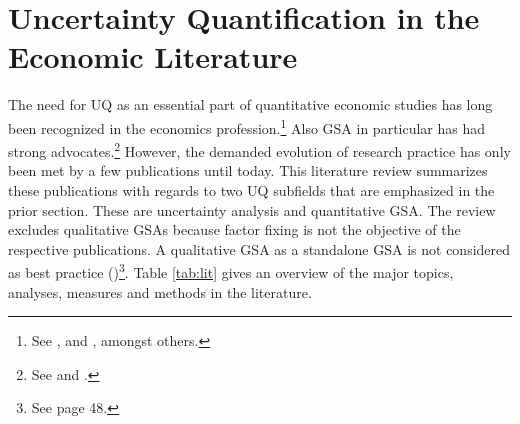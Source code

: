 \section{Uncertainty Quantification in the Economic Literature}
\thispagestyle{plain} %

The need for UQ as an essential part of quantitative economic studies has long been recognized in the economics profession.\footnote{See \cite{Hansen.1996}, \cite{Kydland.1992} and \cite{Canova.1994}, amongst others.} Also GSA in particular has had strong advocates.\footnote{See \cite{Canova.1995} and \cite{Gregory.1995}.} However, the demanded evolution of research practice has only been met by a few publications until today. This literature review summarizes these publications with regards to two UQ subfields that are emphasized in the prior section. These are uncertainty analysis and quantitative GSA. The review excludes qualitative GSAs because factor fixing is not the objective of the respective publications. A qualitative GSA as a standalone GSA is not considered as best practice (\cite{Saltelli.2004})\footnote{See page 48.}. Table \ref{tab:lit} gives an overview of the major topics, analyses, measures and methods in the literature.\\

